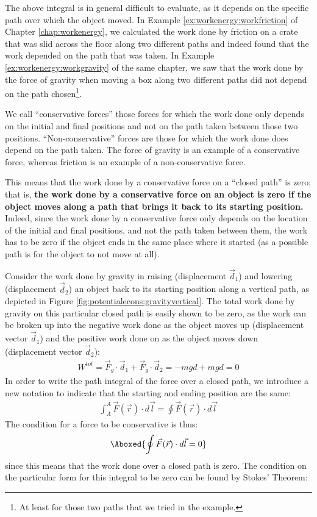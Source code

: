 The above integral is in general difficult to evaluate, as it depends on the specific path over which the object moved. In Example \ref{ex:workenergy:workfriction} of Chapter \ref{chap:workenergy}, we calculated the work done by friction on a crate that was slid across the floor along two different paths and indeed found that the work depended on the path that was taken. In Example \ref{ex:workenergy:workgravity} of the same chapter, we saw that the work done by the force of gravity when moving a box along two different paths did not depend on the path chosen\footnote{At least for those two paths that we tried in the example.}.

We call ``conservative forces'' those forces for which the work done only depends on the initial and final positions and not on the path taken between those two positions. ``Non-conservative'' forces are those for which the work done does depend on the path taken. The force of gravity is an example of a conservative force, whereas friction is an example of a non-conservative force.

This means that the work done by a conservative force on a ``closed path'' is zero; that is, \textbf{the work done by a conservative force on an object is zero if the object moves along a path that brings it back to its starting position.}
Indeed, since the work done by a conservative force only depends on the location of the initial and final positions, and not the path taken between them, the work has to be zero if the object ends in the same place where it started (as a possible path is for the object to not move at all).

Consider the work done by gravity in raising (displacement $\vec d_1$) and lowering (displacement $\vec d_2$) an object back to its starting position along a vertical path, as depicted in Figure \ref{fig:potentialecons:gravityvertical}.
The total work done by gravity on this particular closed path is easily shown to be zero, as the work can be broken up into the negative work done as the object moves up (displacement vector $\vec d_1$) and the positive work done on as the object moves down (displacement vector $\vec d_2$):
\begin{align*}
W^{tot} = \vec F_g \cdot \vec d_1 + \vec F_g \cdot \vec d_2 = -mgd + mgd = 0 
\end{align*}
In order to write the path integral of the force over a closed path, we introduce a new notation to indicate that the starting and ending position are the same:
\begin{align*}
\int_A^A \vec F(\vec r) \cdot d\vec l = \oint \vec F(\vec r) \cdot d\vec l
\end{align*}
The condition for a force to be conservative is thus:
\begin{align}
\Aboxed{\oint \vec F(\vec r) \cdot d\vec l = 0}
\end{align}
since this means that the work done over a closed path is zero. The condition on the particular form for this integral to be zero can be found by Stokes' Theorem:%

